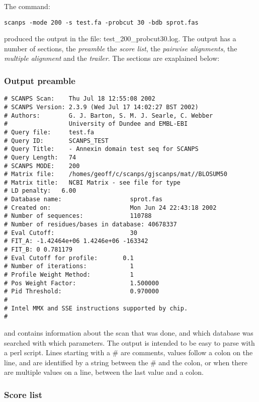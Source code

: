 \documentclass[12pt]{article}
\begin{document}
The command:

\begin{verbatim}
scanps -mode 200 -s test.fa -probcut 30 -bdb sprot.fas
\end{verbatim}

produced the output in the file: test\_200\_probcut30.log.  The output
has a number of sections, the {\em preamble} the {\em score list}, the
{\em pairwise alignments}, the {\em multiple alignment} and the {\em
trailer}.  The sections are exaplained below:


\subsubsection{Output preamble}

\begin{scriptsize}
\begin{verbatim}
# SCANPS Scan:    Thu Jul 18 12:55:08 2002
# SCANPS Version: 2.3.9 (Wed Jul 17 14:02:27 BST 2002)
# Authors:        G. J. Barton, S. M. J. Searle, C. Webber
#                 University of Dundee and EMBL-EBI
# Query file:     test.fa
# Query ID:       SCANPS_TEST
# Query Title:    - Annexin domain test seq for SCANPS                         
# Query Length:   74
# SCANPS MODE:    200
# Matrix file:    /homes/geoff/c/scanps/gjscanps/mat//BLOSUM50
# Matrix title:   NCBI Matrix - see file for type
# LD penalty:   6.00
# Database name:                   sprot.fas
# Created on:                      Mon Jun 24 22:43:18 2002
# Number of sequences:             110788
# Number of residues/bases in database: 40678337
# Eval Cutoff:                     30
# FIT_A: -1.42464e+06 1.4246e+06 -163342
# FIT_B: 0 0.781179 
# Eval Cutoff for profile:       0.1
# Number of iterations:            1
# Profile Weight Method:           1
# Pos Weight Factor:               1.500000
# Pid Threshold:                   0.970000
#
# Intel MMX and SSE instructions supported by chip.
#
\end{verbatim}
\end{scriptsize}

and contains information about the scan that was done, and which database
was searched with which parameters.  The output is intended to be easy
to parse with a perl script.  Lines starting with a \# are comments,
values follow a colon on the line, and are identified by a string
between the \# and the colon, or when there are multiple values on a
line, between the last value and a colon.

\subsubsection{Score list}
\end{document}
